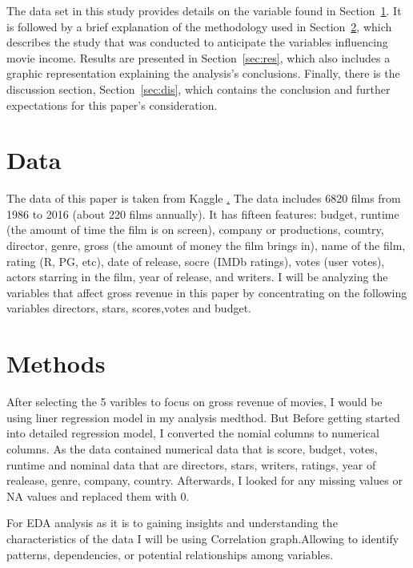 \documentclass[12pt]{article}
\begin{document}
The data set in this study provides details on the variable found in Section~\ref{sec:data}.  
It is followed by a brief explanation of the methodology used in Section~\ref{sec:meth}, 
which describes the study that was conducted to anticipate the variables influencing movie 
income. Results are presented in Section~\ref{sec:res}, which also includes a graphic representation
explaining the analysis's conclusions. Finally, there is the discussion section, 
Section~\ref{sec:dis}, which contains the conclusion and further expectations for this
paper's consideration.

\section{Data}
\label{sec:data}

The data of this paper is taken from Kaggle \href{https://www.kaggle.com/datasets/danielgrijalvas/movies}. 
The data includes 6820 films from 1986 to 2016 (about 220 films annually). It has
fifteen features: budget, runtime (the amount of time the film is on screen), company 
or productions, country, director, genre, gross (the amount of money the film brings in), 
name of the film, rating (R, PG, etc), date of release, socre (IMDb ratings), votes (user votes), actors starring in the
film, year of release, and writers. I will be analyzing the variables that affect
gross revenue in this paper by concentrating on the following variables directors, stars, scores,votes and budget.

\section{Methods}
\label{sec:meth}

After selecting the 5 varibles to focus on gross revenue of movies, I would be using
liner regression model in my analysis medthod. But Before getting started into detailed 
regression model, I converted the nomial columns to numerical columns. As the data contained 
numerical data that is score, budget, votes, runtime and nominal data that are directors, 
stars, writers, ratings, year of realease, genre, company, country. Afterwards, I looked 
for any missing values or NA values and replaced them with 0.

For EDA analysis as it is to gaining insights and understanding the characteristics 
of the data I will be using Correlation graph.Allowing to identify patterns, dependencies,
or potential relationships among variables.
\end{document}
